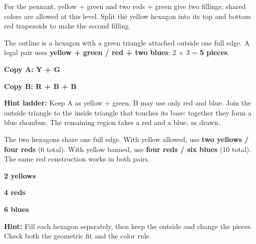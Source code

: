 \documentclass[11pt]{article}
\newcommand{\Subhead}[1]{\par\vspace{4pt}{\large\bfseries #1}\par}
\begin{document}
For the pennant, yellow + green and two reds + green give two fillings; shared colors are allowed at this level. Split the yellow hexagon into its top and bottom red trapezoids to make the second filling.
\Subhead{P1: the pennant / F01-M and F01-U}
The outline is a hexagon with a green triangle attached outside one full edge. A legal pair uses \textbf{yellow + green / red + two blues}: 2 + 3 = \textbf{5 pieces}.
\begin{center}
\begin{minipage}[b]{.32\linewidth}\centering\SolutionPic{\PoneYG}\par\textbf{Copy A: Y + G}\end{minipage}\hspace{.6in}
\begin{minipage}[b]{.32\linewidth}\centering\SolutionPic{\PoneRBB}\par\textbf{Copy B: R + B + B}\end{minipage}
\end{center}
\textbf{Hint ladder:} Keep A as yellow + green. B may use only red and blue. Join the outside triangle to the inside triangle that touches its base: together they form a blue rhombus. The remaining region takes a red and a blue, as drawn.
\Subhead{P2: double hexagon / F01-M and F01-U}
The two hexagons share one full edge. With yellow allowed, use \textbf{two yellows / four reds} (6 total). With yellow banned, use \textbf{four reds / six blues} (10 total). The same red construction works in both pairs.
\begin{center}
\begin{minipage}[b]{.30\linewidth}\centering{}\par\textbf{2 yellows}\end{minipage}\hfill
\begin{minipage}[b]{.30\linewidth}\centering\SolutionPic{\DoubleTiles{\HexReds}}\par\textbf{4 reds}\end{minipage}\hfill
\begin{minipage}[b]{.30\linewidth}\centering\SolutionPic{\DoubleTiles{\HexBlues}}\par\textbf{6 blues}\end{minipage}
\end{center}
\textbf{Hint:} Fill each hexagon separately, then keep the outside and change the pieces. Check both the geometric fit and the color rule.
\newpage
{}
\Subhead{Let the units come from the blocks}
\end{document}
